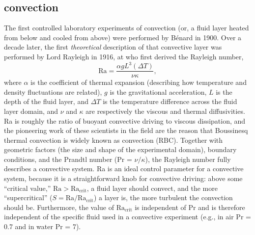 \subsection{\RB convection}
The first controlled laboratory experiments of convection (or, a fluid layer heated from below and cooled from above) were performed by B\'{e}nard in 1900.
Over a decade later, the first \emph{theoretical} description of that convective layer was performed by Lord Rayleigh in 1916, at who first derived the Rayleigh number,
\begin{equation}
\text{Ra} = \frac{\alpha g L^3 (\Delta T)}{\nu \kappa},
\end{equation}
where $\alpha$ is the coefficient of thermal expansion (describing how temperature and density fluctuations are related), $g$ is the gravitational acceleration, $L$ is the depth of the fluid layer, and $\Delta T$ is the temperature difference across the fluid layer domain, and $\nu$ and $\kappa$ are respectively the viscous and thermal diffusivities.
Ra is roughly the ratio of buoyant convective driving to viscous dissipation, and the pioneering work of these scientists in the field are the reason that Boussinesq thermal convection is widely known as \RB convection (RBC).
Together with geometric factors (the size and shape of the experimental domain), boundary conditions, and the Prandtl number (Pr = $\nu/\kappa$), the Rayleigh number fully describes a convective system.
Ra is an ideal control parameter for a convective system, because it is a straightforward knob for convective driving: above some ``critical value,'' $\text{Ra} > \text{Ra}_{\text{crit}}$, a fluid layer should convect, and the more ``supercritical'' ($S = \text{Ra}/\text{Ra}_{\text{crit}}$) a layer is, the more turbulent the convection should be.
Furthermore, the value of $\text{Ra}_{\text{crit}}$ is independent of $\text{Pr}$ and is therefore independent of the specific fluid used in a convective experiment (e.g., in air Pr = 0.7 and in water Pr = 7).

